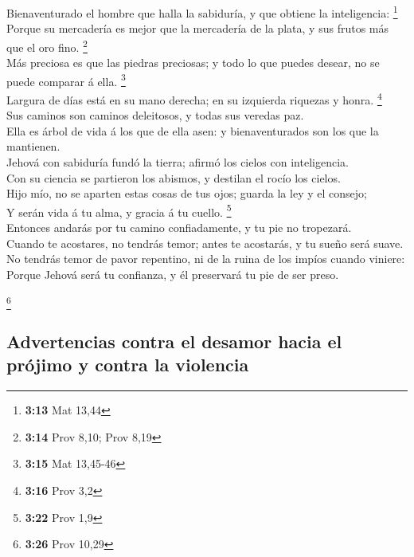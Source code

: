  Bienaventurado el hombre que halla la sabiduría, y que
obtiene la inteligencia: \footnote{\textbf{3:13} Mat 13,44}\\
 Porque su mercadería es mejor que la mercadería de la
plata, y sus frutos más que el oro fino. \footnote{\textbf{3:14} Prov
  8,10; Prov 8,19}\\
 Más preciosa es que las piedras preciosas; y todo lo que
puedes desear, no se puede comparar á ella. \footnote{\textbf{3:15} Mat
  13,45-46}\\
 Largura de días está en su mano derecha; en su izquierda
riquezas y honra. \footnote{\textbf{3:16} Prov 3,2}\\
 Sus caminos son caminos deleitosos, y todas sus veredas
paz.\\
 Ella es árbol de vida á los que de ella asen: y
bienaventurados son los que la mantienen.\\
 Jehová con sabiduría fundó la tierra; afirmó los cielos
con inteligencia.\\
 Con su ciencia se partieron los abismos, y destilan el
rocío los cielos.\\
 Hijo mío, no se aparten estas cosas de tus ojos; guarda la
ley y el consejo;\\
 Y serán vida á tu alma, y gracia á tu cuello.
\footnote{\textbf{3:22} Prov 1,9}\\
 Entonces andarás por tu camino confiadamente, y tu pie no
tropezará.\\
 Cuando te acostares, no tendrás temor; antes te acostarás,
y tu sueño será suave.\\
 No tendrás temor de pavor repentino, ni de la ruina de los
impíos cuando viniere:\\
 Porque Jehová será tu confianza, y él preservará tu pie de
ser preso.

\footnote{\textbf{3:26} Prov 10,29}

\hypertarget{advertencias-contra-el-desamor-hacia-el-pruxf3jimo-y-contra-la-violencia}{%
\subsection{Advertencias contra el desamor hacia el prójimo y contra la
violencia}\label{advertencias-contra-el-desamor-hacia-el-pruxf3jimo-y-contra-la-violencia}}

